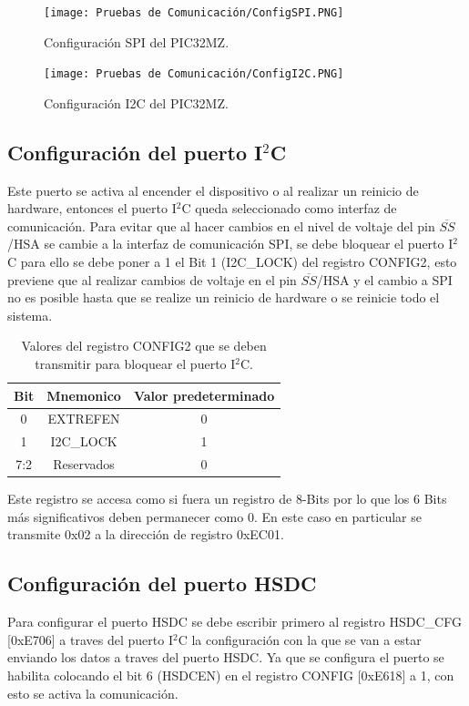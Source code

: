 \documentclass[letterpaper,12pt,oneside]{book}
\begin{document}
			\begin{figure}[!htpb]
				\centering
				\texttt{[image: Pruebas de Comunicación/ConfigSPI.PNG]}
				\caption[Configuración SPI del PIC32MZ]{Configuración SPI del PIC32MZ.}
				\label{ConfigSPI} 
				\hfill \break
				\texttt{[image: Pruebas de Comunicación/ConfigI2C.PNG]}
				\caption[Configuración I2C del PIC32MZ]{Configuración I2C del PIC32MZ.}
				\label{ConfigI2C}
			\end{figure}

			\subsection{Configuración del puerto I$^2$C}
			Este puerto se activa al encender el dispositivo o al realizar un reinicio de hardware, entonces el puerto I$^2$C queda seleccionado como interfaz de comunicación. Para evitar que al hacer cambios en el nivel de voltaje del pin $\overline{SS}$/HSA se cambie a la interfaz de comunicación SPI, se debe bloquear el puerto I$^2$C para ello se debe poner a 1 el Bit 1 (I2C\_LOCK) del registro CONFIG2, esto previene que al realizar cambios de voltaje en el pin $\overline{SS}$/HSA y el cambio a SPI no es posible hasta que se realize un reinicio de hardware o se reinicie todo el sistema.

			\begin{table}[ht]
				\centering
				\begin{tabular}{c | c | c}
					\textbf{Bit} & \textbf{Mnemonico} & \textbf{Valor predeterminado} \\
					\hline
					0 & EXTREFEN & 0 \\
					\hline
					1 & I2C\_LOCK & 1 \\
					\hline
					7:2 & Reservados & 0 \\
				\end{tabular}
				\caption[Valores de bloqueo del puerto I$^2$C]{Valores del registro CONFIG2 que se deben transmitir para bloquear el puerto I$^2$C.}
			\end{table}

			Este registro se accesa como si fuera un registro de 8-Bits por lo que los 6 Bits más significativos deben permanecer como 0. En este caso en particular se transmite 0x02 a la dirección de registro 0xEC01.

			\subsection{Configuración del puerto HSDC}
			Para configurar el puerto HSDC se debe escribir primero al registro HSDC\_CFG [0xE706] a traves del puerto I$^2$C la configuración con la que se van a estar enviando los datos a traves del puerto HSDC. Ya que se configura el puerto se habilita colocando el bit 6 (HSDCEN) en el registro CONFIG [0xE618] a 1, con esto se activa la comunicación.
\end{document}
